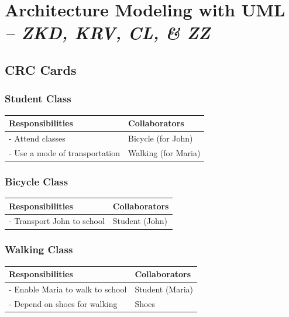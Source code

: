 \chapter{Architecture Modeling with UML \\
\small{\textit{-- ZKD, KRV, CL, \& ZZ}}
\label{Chapter::ArchitectureModeling}}

\section{CRC Cards}
\begin{description}
   
\subsection{Student Class}
\begin{center}
\begin{tabular}{|p{5cm}|p{5cm}|}
    \hline
    \textbf{Responsibilities} & \textbf{Collaborators} \\
    \hline
    - Attend classes & Bicycle (for John) \\
    - Use a mode of transportation & Walking (for Maria) \\
    \hline
\end{tabular}
\end{center}

\subsection{Bicycle Class}
\begin{center}
\begin{tabular}{|p{5cm}|p{5cm}|}
    \hline
    \textbf{Responsibilities} & \textbf{Collaborators} \\
    \hline
    - Transport John to school & Student (John) \\
    \hline
\end{tabular}
\end{center}
\subsection{Walking Class}
\begin{center}
\begin{tabular}{|p{5cm}|p{5cm}|}
    \hline
    \textbf{Responsibilities} & \textbf{Collaborators} \\
    \hline
    - Enable Maria to walk to school & Student (Maria) \\
    - Depend on shoes for walking & Shoes \\
    \hline
\end{tabular}
\end{center}


\end{description}
